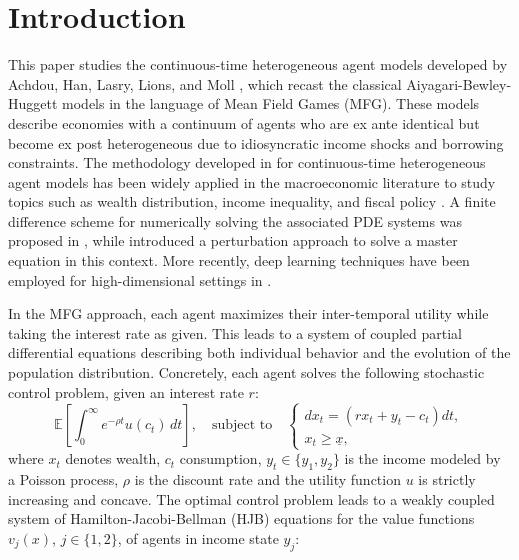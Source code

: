 \documentclass[11pt]{article}
\numberwithin{equation}{section}
\theoremstyle{Claim}
\theoremstyle{plain}
\begin{document}
\section{Introduction}
This paper studies the continuous-time heterogeneous agent models developed by Achdou, Han, Lasry, Lions, and Moll \cite{achdou2022income}, which recast the classical Aiyagari-Bewley-Huggett models \cite{huggett1993risk,aiyagari1994uninsured,ljungqvist2018recursive} in the language of Mean Field Games (MFG). These models describe economies with a continuum of agents who are ex ante identical but become ex post heterogeneous due to idiosyncratic income shocks and borrowing constraints. 
The methodology developed in \cite{achdou2022income} for continuous-time heterogeneous agent models has been widely applied in the macroeconomic literature to study topics such as wealth distribution, income inequality, and fiscal policy \cite{ahn2018inequality,kaplan2018monetary,bhandari2021inequality,fernandez2023financial}. A finite difference scheme for numerically solving the associated PDE systems was proposed in \cite{achdou2022income}, while \cite{bilal2023solving} introduced a perturbation approach to solve a master equation in this context. More recently, deep learning techniques have been employed for high-dimensional settings in \cite{achdou2022simulating,gu2024global}. \par
%
In the MFG approach, each agent maximizes their inter-temporal utility while taking the interest rate as given. This leads to a system of coupled partial differential equations describing both individual behavior and the evolution of the population distribution. Concretely, each agent solves the following stochastic control problem, given an interest rate $r$:
\begin{equation}\label{control_problem}
	\mathbb{E}\left[\int_0^{\infty} e^{-\rho t} u(c_t) \, dt\right], \quad \text{subject to} \quad
\begin{cases}
	dx_t = (r x_t + y_t - c_t)dt, \\
	x_t \geq \underline{x},
\end{cases}
\end{equation}
where $x_t$ denotes wealth, $c_t$ consumption, $y_t \in \{y_1, y_2\}$ is the income modeled by a Poisson process, $\rho$ is the discount rate and the utility function  $u$ is  strictly increasing and concave.
The optimal control problem leads to a weakly coupled  system of Hamilton-Jacobi-Bellman (HJB) equations for the value functions $v_j(x)$, $j \in \{1, 2\}$, of agents in income state $y_j$:
\end{document}
